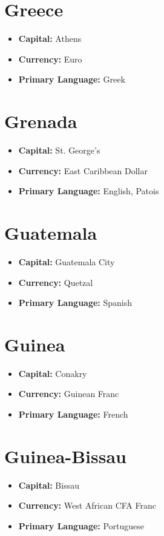 \documentclass[a4paper,100pt,twoside]{book}
\begin{document}
\section*{\Huge Greece}
\vspace{5mm} %
\begin{itemize}
	\item \textbf{Capital:} Athens
	\item \textbf{Currency:} Euro
	\item \textbf{Primary Language:} Greek
\end{itemize}

\section*{\Huge Grenada}
\vspace{5mm} %
\begin{itemize}
	\item \textbf{Capital:} St. George's
	\item \textbf{Currency:} East Caribbean Dollar
	\item \textbf{Primary Language:} English, Patois
\end{itemize}

\section*{\Huge Guatemala}
\vspace{5mm} %
\begin{itemize}
	\item \textbf{Capital:} Guatemala City
	\item \textbf{Currency:} Quetzal
	\item \textbf{Primary Language:} Spanish
\end{itemize}

\section*{\Huge Guinea}
\vspace{5mm} %
\begin{itemize}
	\item \textbf{Capital:} Conakry
	\item \textbf{Currency:} Guinean Franc
	\item \textbf{Primary Language:} French
\end{itemize}

\section*{\Huge Guinea-Bissau}
\vspace{5mm} %
\begin{itemize}
	\item \textbf{Capital:} Bissau
	\item \textbf{Currency:} West African CFA Franc
	\item \textbf{Primary Language:} Portuguese
\end{itemize}
\end{document}
